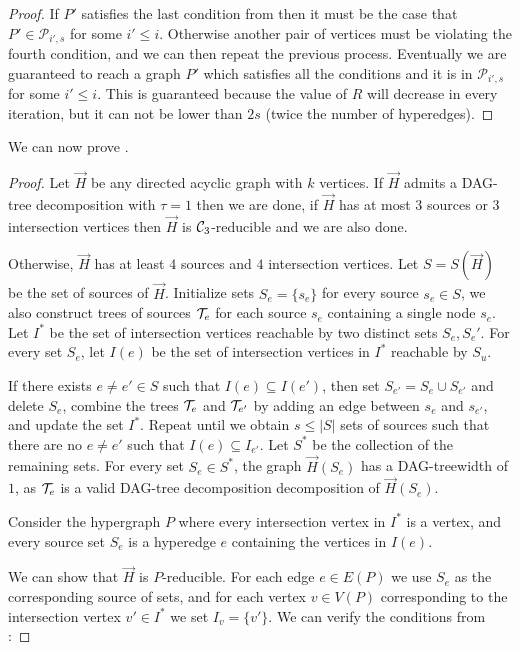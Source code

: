 \documentclass[a4paper,UKenglish,cleveref, autoref, numberwithinsect, thm-restate]{lipics-v2021}
\newcommand{\reducible}[1]{${#1}$-reducible}
\newcommand{\cycle}[1]{\cC_{#1}}
\newcommand{\dagtree}{DAG-tree decomposition}
\newcommand{\dagtreewidth}{DAG-treewidth}
\newcommand{\cC}{{\cal C}}
\newcommand{\cT}{{\cal T}}
\begin{document}
\begin{proof}
		If $P'$ satisfies the last condition from  then it must be the case that $P' \in \mathcal{P}_{i',s}$ for some $i' \leq i$. Otherwise another pair of vertices must be violating the fourth condition, and we can then repeat the previous process. Eventually we are guaranteed to reach a graph $P'$ which satisfies all the conditions and it is in $\mathcal{P}_{i',s}$ for some $i' \leq i$. This is guaranteed because the value of $R$ will decrease in every iteration, but it can not be lower than $2s$ (twice the number of hyperedges).
	\end{proof}
	
	We can now prove .
	
	\pkcomputable*
	\begin{proof}
		Let $\vec{H}$ be any directed acyclic graph with $k$ vertices. If $\vec{H}$ admits a \dagtree{} with $\tau=1$ then we are done, if $\vec{H}$ has at most $3$ sources or $3$ intersection vertices then $\vec{H}$ is \reducible{\cycle{3}} and we are also done.
		
		Otherwise, $\vec{H}$ has at least $4$ sources and $4$ intersection vertices. Let $S = S(\vec{H})$ be the set of sources of $\vec{H}$. Initialize sets $S_e = \{s_e\}$ for every source $s_e \in S$, we also construct trees of sources $\cT_e$ for each source $s_e$ containing a single node $s_e$. Let $I^*$ be the set of intersection vertices reachable by two distinct sets $S_e,S_e'$. For every set $S_e$, let $I(e)$ be the set of intersection vertices in $I^*$ reachable by $S_u$. 
		
		If there exists $e \neq e' \in S$ such that $I(e) \subseteq I(e')$, then set $S_{e'} = S_e \cup S_{e'}$ and delete $S_e$, combine the trees $\cT_e$ and $\cT_{e'}$ by adding an edge between $s_e$ and $s_{e'}$, and update the set $I^*$. Repeat until we obtain $s \leq |S|$ sets of sources such that there are no $e \neq e'$ such that $I(e) \subseteq I_{e'}$. Let $S^*$ be the collection of the remaining sets. For every set $S_e \in S^*$, the graph $\vec{H}(S_e)$ has a \dagtreewidth{} of $1$, as $\cT_e$ is a valid \dagtree{} decomposition of $\vec{H}(S_e)$.
		
		Consider the hypergraph $P$ where every intersection vertex in $I^*$ is a vertex, and every source set $S_e$ is a hyperedge $e$ containing the vertices in $I(e)$.
		
		We can show that $\vec{H}$ is \reducible{P}. For each edge $e \in E(P)$ we use $S_e$ as the corresponding source of sets, and for each vertex $v \in V(P)$ corresponding to the intersection vertex $v' \in I^*$ we set $I_v = \{v'\}$. We can verify the conditions from :
		

\end{proof}
\end{document}
